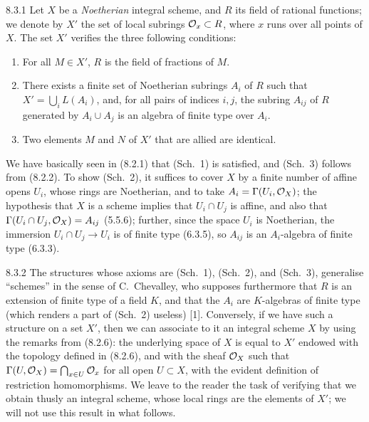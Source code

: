 \documentclass[../main.tex]{subfiles}
\begin{document}
\begin{env}{8.3.1}
    Let $X$ be a \emph{Noetherian} integral scheme, and $R$ its field of rational functions; we denote by $X'$ the set of local subrings $\mathcal{O}_x\subset R$, where $x$ runs over all points of $X$.
    The set $X'$ verifies the three following conditions:
    \begin{enumerate}
        \item[(Sch. 1)] For all $M\in X'$, $R$ is the field of fractions of $M$.
        \item[(Sch. 2)] There exists a finite set of Noetherian subrings $A_i$ of $R$ such that $X'=\bigcup_i L(A_i)$, and, for all pairs of indices $i,j$, the subring $A_{ij}$ of $R$ generated by $A_i\cup A_j$ is an algebra of finite type over $A_i$.
        \item[(Sch. 3)] Two elements $M$ and $N$ of $X'$ that are allied are identical.
    \end{enumerate}
\end{env}

We have basically seen in (8.2.1) that (Sch.~1) is satisfied, and (Sch.~3) follows from (8.2.2).
To show (Sch.~2), it suffices to cover $X$ by a finite number of affine opens $U_i$, whose rings are Noetherian, and to take $A_i=\Gamma(U_i,\mathcal{O}_X)$; the hypothesis that $X$ is a scheme implies that $U_i\cap U_j$ is affine, and also that $\Gamma(U_i\cap U_j,\mathcal{O}_X)=A_{ij}$ (5.5.6); further, since the space $U_i$ is Noetherian, the immersion $U_i\cap U_j\to U_i$ is of finite type (6.3.5), so $A_{ij}$ is an $A_i$-algebra of finite type (6.3.3).

\begin{env}{8.3.2}
    The structures whose axioms are (Sch.~1), (Sch.~2), and (Sch.~3), generalise ``schemes'' in the sense of C.~Chevalley, who supposes furthermore that $R$ is an extension of finite type of a field $K$, and that the $A_i$ are $K$-algebras of finite type (which renders a part of (Sch.~2) useless) [1].
    Conversely, if we have such a structure on a set $X'$, then we can associate to it an integral scheme $X$ by using the remarks from (8.2.6): the underlying space of $X$ is equal to $X'$ endowed with the topology defined in (8.2.6), and with the sheaf $\mathcal{O}_X$ such that $\Gamma(U,\mathcal{O}_X)=\bigcap_{x\in U}\mathcal{O}_x$ for all open $U\subset X$, with the evident definition of restriction homomorphisms.
    We leave to the reader the task of verifying that we obtain thusly an integral scheme, whose local rings are the elements of $X'$; we will not use this result in what follows.
\end{env}
\end{document}
